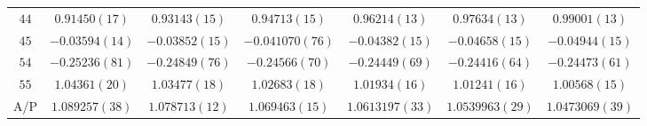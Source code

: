 \begin{table}
\begin{center}
\begin{tabular}{c|c c c c c c}
$44$ & $0.91450(17)$ & $0.93143(15)$ & $0.94713(15)$ & $0.96214(13)$ & $0.97634(13)$ & $0.99001(13)$ \\
$45$ & $-0.03594(14)$ & $-0.03852(15)$ & $-0.041070(76)$ & $-0.04382(15)$ & $-0.04658(15)$ & $-0.04944(15)$ \\
$54$ & $-0.25236(81)$ & $-0.24849(76)$ & $-0.24566(70)$ & $-0.24449(69)$ & $-0.24416(64)$ & $-0.24473(61)$ \\
$55$ & $1.04361(20)$ & $1.03477(18)$ & $1.02683(18)$ & $1.01934(16)$ & $1.01241(16)$ & $1.00568(15)$ \\
\hline
A/P & $1.089257(38)$ & $1.078713(12)$ & $1.069463(15)$ & $1.0613197(33)$ & $1.0539963(29)$ & $1.0473069(39)$ \\
\hline
\hline
\end{tabular}
\end{center}
\end{table}
